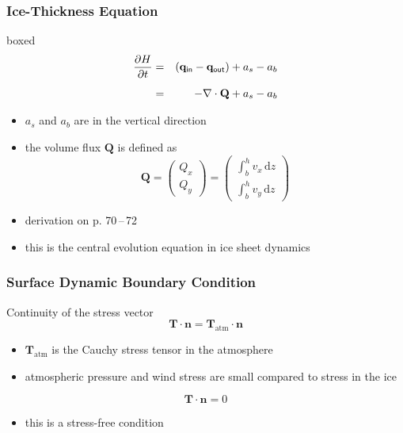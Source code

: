 \documentclass[hide notes,intlimits]{beamer}
\begin{document}
\begin{frame}
  \frametitle{Ice-Thickness Equation}
      \begin{beamercolorbox}[rounded=true,shadow=true]{boxed}
        \begin{eqnarray} \notag
     \frac{\partial H}{\partial t} &=& (\mathbf{q}_{\sf{in}} - \mathbf{q}_{\sf{out}}) + a_{s} - a_{b} \\[.5em]
      &=& - \nabla \cdot \mathbf{Q} + a_{s} - a_{b}
    \end{eqnarray}
  \end{beamercolorbox}
\begin{itemize}
  \item $ a_{s}$ and $a_{b}$ are in the vertical direction
  \item the volume flux $\mathbf{Q}$ is defined as
    \begin{equation*}
      \mathbf{Q} = 
      \left(
        \begin{array}{c}
          Q_x \\[.25em]
          Q_y
        \end{array}
      \right)
      =
      \left(
        \begin{array}{c}
          \int_{b}^{h} v_{x} \,\text{d} z \\[.25em]
          \int_{b}^{h} v_{y} \,\text{d} z
        \end{array}
      \right)
    \end{equation*}
  \item derivation on p. 70\,--\,72
  \item this is the central evolution equation in ice sheet dynamics
  \end{itemize}
\end{frame}





\begin{frame}
  \frametitle{Surface Dynamic Boundary Condition}
  Continuity of the stress vector
  \begin{equation}
    \mathbf{T}\cdot\mathbf{n} = \mathbf{T}_{\text{atm}}\cdot\mathbf{n}
  \end{equation}
  \begin{itemize}
  \item $\mathbf{T}_{\text{atm}}$ is the Cauchy stress tensor in the atmosphere
  \item atmospheric pressure and wind stress are small compared to stress in the ice
  \end{itemize}
  \begin{equation}
    \mathbf{T}\cdot\mathbf{n} = 0
  \end{equation}
  \begin{itemize}
  \item this is a \alert{stress-free condition}
  \end{itemize}
\end{frame}
\end{document}
